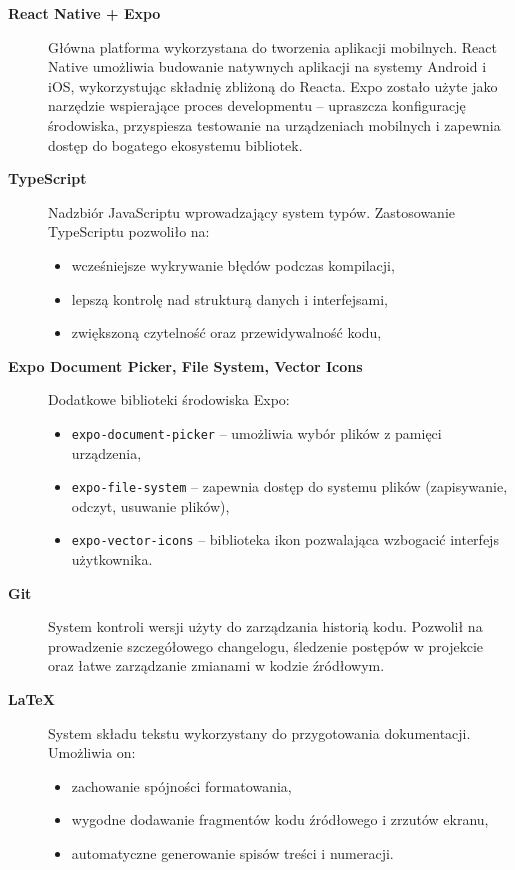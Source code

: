 \documentclass[12pt,a4paper]{article}
\begin{document}
\begin{description}
    \item[\textbf{React Native + Expo}] 
    Główna platforma wykorzystana do tworzenia aplikacji mobilnych. 
    React Native umożliwia budowanie natywnych aplikacji na systemy Android i iOS, wykorzystując składnię zbliżoną do Reacta. 
    Expo zostało użyte jako narzędzie wspierające proces developmentu – upraszcza konfigurację środowiska, przyspiesza testowanie na urządzeniach mobilnych i zapewnia dostęp do bogatego ekosystemu bibliotek.

    \item[\textbf{TypeScript}] 
    Nadzbiór JavaScriptu wprowadzający system typów. 
    Zastosowanie TypeScriptu pozwoliło na: 
    \begin{itemize}
        \item wcześniejsze wykrywanie błędów podczas kompilacji,
        \item lepszą kontrolę nad strukturą danych i interfejsami,
        \item zwiększoną czytelność oraz przewidywalność kodu,
    \end{itemize}

    \item[\textbf{Expo Document Picker, File System, Vector Icons}] 
    Dodatkowe biblioteki środowiska Expo: 
    \begin{itemize}
        \item \texttt{expo-document-picker} – umożliwia wybór plików z pamięci urządzenia, 
        \item \texttt{expo-file-system} – zapewnia dostęp do systemu plików (zapisywanie, odczyt, usuwanie plików),
        \item \texttt{expo-vector-icons} – biblioteka ikon pozwalająca wzbogacić interfejs użytkownika.
    \end{itemize}

    \item[\textbf{Git}] 
    System kontroli wersji użyty do zarządzania historią kodu. 
    Pozwolił na prowadzenie szczegółowego changelogu, śledzenie postępów w projekcie oraz łatwe zarządzanie zmianami w kodzie źródłowym.

    \item[\textbf{LaTeX}] 
    System składu tekstu wykorzystany do przygotowania dokumentacji. 
    Umożliwia on: 
    \begin{itemize}
        \item zachowanie spójności formatowania,
        \item wygodne dodawanie fragmentów kodu źródłowego i zrzutów ekranu,
        \item automatyczne generowanie spisów treści i numeracji.
    \end{itemize}
\end{description}
\end{document}
